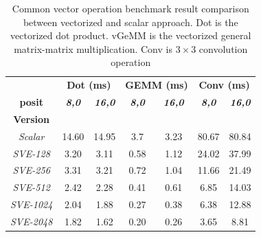 \begin{table}
    \centering
     \caption{Common vector operation benchmark result comparison between vectorized and scalar approach. Dot is the vectorized dot product. vGeMM is the vectorized general matrix-matrix multiplication. Conv is $3\times3$ convolution operation}
    \label{tab:vec_res}    
\begin{tabular}{ccccccc}
\hline
                   & \multicolumn{2}{c}{\textbf{Dot (ms)}}   & \multicolumn{2}{c}{\textbf{GEMM (ms)}}       & \multicolumn{2}{c}{\textbf{Conv (ms)}}       \\ 
\textbf{posit} & \textit{\textbf{8,0}} & \textit{\textbf{16,0}} & \textit{\textbf{8,0}} & \textit{\textbf{16,0}} & \textit{\textbf{8,0}} & \textit{\textbf{16,0}} \\
\textbf{Version}   & \multicolumn{6}{c}{}                                                                                                                 \\ \hline
\textit{Scalar}     &     14.60           &  14.95               &           3.7          &         3.23             &       80.67              &        80.84              \\
\textit{SVE-128}   &    3.20             &  3.11                &           0.58          &         1.12             &      24.02               &       37.99               \\
\textit{SVE-256}   &     3.31            & 3.21                      &      0.72               &    1.04                  & 11.66                    &  21.49                    \\
\textit{SVE-512}   &    2.42             &  2.28                 &          0.41           &        0.61              &     6.85                &       14.03               \\
\textit{SVE-1024}  &    2.04             &      1.88                &       0.27              &     0.38                 &  6.38                   &    12.88                  \\
\textit{SVE-2048}  &    1.82             &      1.62               &        0.20             &      0.26                &   3.65                  &     8.81                 \\ \hline
\end{tabular}

\end{table}

